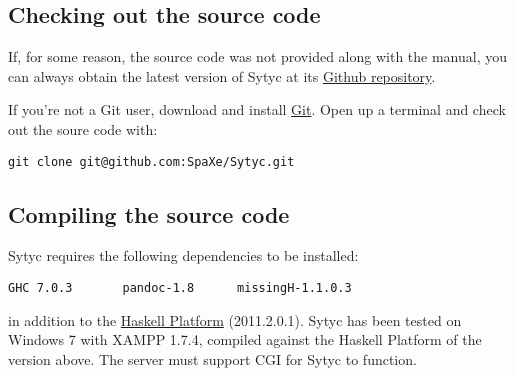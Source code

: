 \documentclass[a4paper]{article}
\begin{document}
\subsection{Checking out the source code}

If, for some reason, the source code was not provided along with the manual, you can always obtain the latest version of Sytyc at its  \href{https://github.com/SpaXe/Sytyc}{Github repository}.

If you're not a Git user, download and install \href{http://git-scm.com/}{Git}.  Open up a terminal and check out the soure code with:
\begin{verbatim}
git clone git@github.com:SpaXe/Sytyc.git
\end{verbatim}

\subsection{Compiling the source code}

Sytyc requires the following dependencies to be installed:
\begin{verbatim}
GHC 7.0.3       pandoc-1.8      missingH-1.1.0.3
\end{verbatim}
in addition to the \href{http://hackage.haskell.org/platform/}{Haskell Platform} (2011.2.0.1).  Sytyc has been tested on Windows 7 with XAMPP 1.7.4, compiled against the Haskell Platform of the version above.  The server must support CGI for Sytyc to function.
\end{document}
